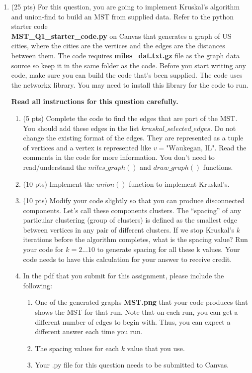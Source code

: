 \documentclass[12pt]{article}
\theoremstyle{remark}
\begin{document}
\hrulefill

\newpage
\begin{enumerate}

\item (25 pts) For this question, you are going to implement Kruskal's algorithm and union-find to build an MST from supplied data. Refer to the python starter code \\ \textbf{MST\_Q1\_starter\_code.py} on Canvas that generates a graph of US cities, where the cities are the vertices and the edges are the distances between them. The code requires \textbf{miles\_dat.txt.gz} file as the graph data source so keep it in the same folder as the code. Before you start writing any code, make sure you can build the code that's been supplied. The code uses the networkx library. You may need to install this library for the code to run.

\textbf{Read all instructions for this question carefully.} 

\begin{enumerate}[label=(\alph*)]

\item (5 pts) Complete the code to find the edges that are part of the MST. You should add these edges in the list $kruskal\_selected\_edges$. Do not change the existing format of the edges. They are represented as a tuple of vertices and a vertex is represented like $v = \text{"Waukegan, IL"}$. Read the comments in the code for more information. You don't need to read/understand the $miles\_graph()$ and $draw\_graph()$ functions. 

\item (10 pts) Implement the $union()$ function to implement Kruskal's.\\


\item (10 pts) Modify your code slightly so that you can produce disconnected components. Let's call these components clusters. The “spacing” of any particular clustering (group of clusters) is defined as the smallest edge between vertices in any pair of different clusters. If we stop Kruskal's $k$ iterations before the algorithm completes, what is the spacing value? Run your code for $k = 2...10$ to generate spacing for all these k values. Your code needs to have this calculation for your answer to receive credit. \\
\item In the pdf that you submit for this assignment, please include the following:
\begin{enumerate}
    \item One of the generated graphs \textbf{MST.png} that your code produces that shows the MST for that run. Note that on each run, you can get a different number of edges to begin with. Thus, you can expect a different answer each time you run.
    \item The spacing values for each $k$ value that you use.
    \item Your .py file for this question needs to be submitted to Canvas.
\end{enumerate}
\pagebreak


\end{enumerate}
\end{enumerate}
\end{document}

